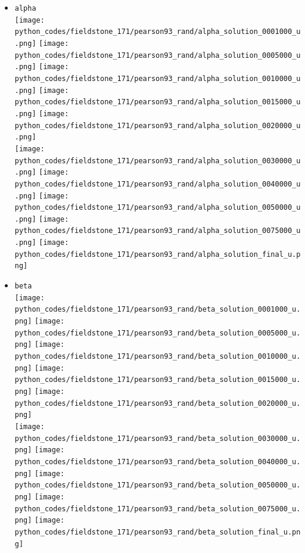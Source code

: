\begin{itemize}
\item {\tt alpha}\\
\texttt{[image: python\_codes/fieldstone\_171/pearson93\_rand/alpha\_solution\_0001000\_u.png]}
\texttt{[image: python\_codes/fieldstone\_171/pearson93\_rand/alpha\_solution\_0005000\_u.png]}
\texttt{[image: python\_codes/fieldstone\_171/pearson93\_rand/alpha\_solution\_0010000\_u.png]}
\texttt{[image: python\_codes/fieldstone\_171/pearson93\_rand/alpha\_solution\_0015000\_u.png]}
\texttt{[image: python\_codes/fieldstone\_171/pearson93\_rand/alpha\_solution\_0020000\_u.png]}\\
\texttt{[image: python\_codes/fieldstone\_171/pearson93\_rand/alpha\_solution\_0030000\_u.png]}
\texttt{[image: python\_codes/fieldstone\_171/pearson93\_rand/alpha\_solution\_0040000\_u.png]}
\texttt{[image: python\_codes/fieldstone\_171/pearson93\_rand/alpha\_solution\_0050000\_u.png]}
\texttt{[image: python\_codes/fieldstone\_171/pearson93\_rand/alpha\_solution\_0075000\_u.png]}
\texttt{[image: python\_codes/fieldstone\_171/pearson93\_rand/alpha\_solution\_final\_u.png]}

\item {\tt beta}\\
\texttt{[image: python\_codes/fieldstone\_171/pearson93\_rand/beta\_solution\_0001000\_u.png]}
\texttt{[image: python\_codes/fieldstone\_171/pearson93\_rand/beta\_solution\_0005000\_u.png]}
\texttt{[image: python\_codes/fieldstone\_171/pearson93\_rand/beta\_solution\_0010000\_u.png]}
\texttt{[image: python\_codes/fieldstone\_171/pearson93\_rand/beta\_solution\_0015000\_u.png]}
\texttt{[image: python\_codes/fieldstone\_171/pearson93\_rand/beta\_solution\_0020000\_u.png]}\\
\texttt{[image: python\_codes/fieldstone\_171/pearson93\_rand/beta\_solution\_0030000\_u.png]}
\texttt{[image: python\_codes/fieldstone\_171/pearson93\_rand/beta\_solution\_0040000\_u.png]}
\texttt{[image: python\_codes/fieldstone\_171/pearson93\_rand/beta\_solution\_0050000\_u.png]}
\texttt{[image: python\_codes/fieldstone\_171/pearson93\_rand/beta\_solution\_0075000\_u.png]}
\texttt{[image: python\_codes/fieldstone\_171/pearson93\_rand/beta\_solution\_final\_u.png]}


\end{itemize}
